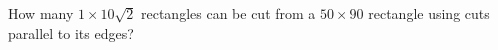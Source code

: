 How many $1 \times 10\sqrt 2$ rectangles can be cut from a $50\times 90$ rectangle using cuts parallel to its edges?